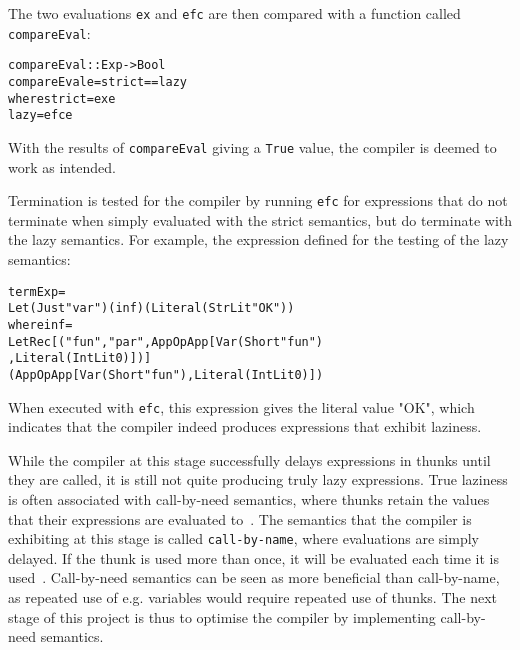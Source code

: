 \noindent The two evaluations \texttt{ex} and \texttt{efc} are then compared
with a function called \texttt{compareEval}:
\newpage
\begin{alltt}
  compareEval :: Exp -> Bool
  compareEval e = strict == lazy
    where strict = ex e
          lazy   = efc e
\end{alltt}

\noindent
With the results of \texttt{compareEval} giving a \texttt{True} value,
the compiler is deemed to work as intended.

Termination is tested for the compiler by running \texttt{efc} for expressions
that do not terminate when simply evaluated with the strict semantics, but do
terminate with the lazy semantics. For example, the expression defined for the
testing of the lazy semantics:

\begin{alltt}
  termExp =
    Let (Just "var") (inf) (Literal (StrLit "OK"))
    where inf =
      LetRec [("fun", "par", App OpApp [Var (Short "fun")
                                       ,Literal (IntLit 0)])]
      (App OpApp [Var (Short "fun"), Literal (IntLit 0)])
\end{alltt}

\noindent When executed with \texttt{efc}, this expression gives the literal
value "OK", which indicates that the compiler indeed produces expressions that
exhibit laziness.

While the compiler at this stage successfully delays expressions in thunks
until they are called, it is still not quite producing truly lazy expressions.
True laziness is often associated with call-by-need semantics, where thunks
retain the values that their expressions are evaluated to~\cite{pltbook}.
The semantics that
the compiler is exhibiting at this stage is called \texttt{call-by-name}, where
evaluations are simply delayed. If the thunk is used more than once, it will
be evaluated each time it is used~\cite{DragonBook}.
Call-by-need semantics can be seen as more beneficial than call-by-name, as
repeated use of e.g. variables would require repeated use of thunks.
The next stage of this project is thus to optimise the compiler by implementing
call-by-need semantics.
